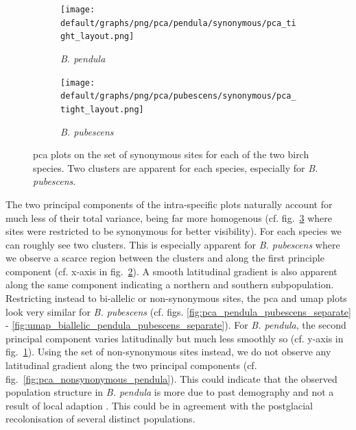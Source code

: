 \documentclass[hidelinks,11pt]{article}
\newcommand{\pendula}{\textit{B. pendula}}
\newcommand{\pubescens}{\textit{B. pubescens}}
\begin{document}
{    \begin{figure}[ht]
        \centering
        \begin{subfigure}[b]{0.492\textwidth}
            \centering
            \texttt{[image: default/graphs/png/pca/pendula/synonymous/pca\_tight\_layout.png]}
            \caption{\pendula{}}
            \label{fig:pca_synonymous_pendula}
        \end{subfigure}
        \hfill
        \begin{subfigure}[b]{0.49\textwidth}
            \centering
            \texttt{[image: default/graphs/png/pca/pubescens/synonymous/pca\_tight\_layout.png]}
            \caption{\pubescens{}}
            \label{fig:pca_synonymous_pubescens}
        \end{subfigure}
        \caption{\acrshort{pca} plots on the set of synonymous sites for each of the two birch species. Two clusters are apparent for each species, especially for \pubescens{}.}
        \label{fig:pca_synonymous_pendula_pubescens_separate}
    \end{figure}

    The two principal components of the intra-specific plots naturally account for much less of their total variance, being far more homogenous (cf. fig.~\ref{fig:pca_synonymous_pendula_pubescens_separate} where sites were restricted to be synonymous for better visibility). For each species we can roughly see two clusters. This is especially apparent for \pubescens{} where we observe a scarce region between the clusters and along the first principle component (cf. x-axis in fig.~\ref{fig:pca_synonymous_pubescens}). A smooth latitudinal gradient is also apparent along the same component indicating a northern and southern subpopulation. Restricting instead to bi-allelic or non-synonymous sites, the \acrshort{pca} and \acrshort{umap} plots look very similar for \pubescens{} (cf. figs. \ref{fig:pca_pendula_pubescens_separate} - \ref{fig:umap_biallelic_pendula_pubescens_separate}). For \pendula{}, the second principal component varies latitudinally but much less smoothly so (cf. y-axis in fig.~\ref{fig:pca_synonymous_pendula}). Using the set of non-synonymous sites instead, we do not observe any latitudinal gradient along the two principal components (cf. fig.~\ref{fig:pca_nonsynonymous_pendula}). This could indicate that the observed population structure in \pendula{} is more due to past demography and not a result of local adaption . This could be in agreement with the postglacial recolonisation of several distinct populations.

}
\end{document}

